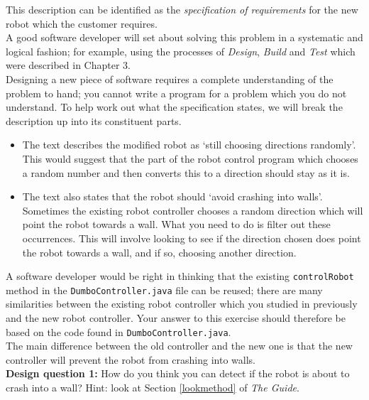 \noindent
This description can be identified as the {\em specification of
requirements} for the new robot which the customer requires. \\

\noindent
A good software developer will set about solving this problem in a 
systematic and logical fashion; for example, using the processes of 
{\it Design}, {\it Build} and {\it Test} which were described in 
Chapter 3.\\

\noindent
Designing a new piece of software requires a complete understanding of 
the problem to hand; you cannot write a program for a problem which you 
do not understand. To help work out what the specification states, we will 
break the description up into its constituent parts. 

\begin{itemize}

\item
The text describes the modified robot as `still choosing directions
randomly'. This would suggest that the part of the robot control program which
chooses a random number and then converts this to a direction should stay as 
it is. 

\item
The text also states that the robot should `avoid crashing into
walls'. Sometimes the existing robot controller chooses a random direction
which will point the
robot towards a wall. What you need to do is filter out these
occurrences. This will involve looking to see if the direction chosen
does point the robot towards a wall, and if so, choosing another
direction. 

\end{itemize}

\noindent
A software developer would be right in thinking that the existing 
{\tt controlRobot} method in the {\tt DumboController.java} file 
can be reused; 
there are many similarities between the existing robot 
controller which you studied in previously and the new robot controller. 
Your answer to this exercise should therefore be based on the code 
found in {\tt DumboController.java}. \\

\noindent
The main difference between the old controller and the new one is that the 
new controller will prevent the robot from crashing into walls. \\

\noindent
{\bf Design question 1:}
How do you think you can detect if the robot is about to crash into a wall? 
Hint: look at Section \ref{lookmethod} of {\it The Guide}. \\ 

